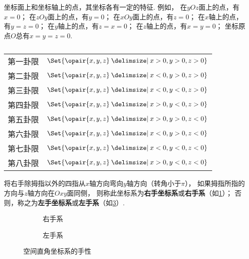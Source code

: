 坐标面上和坐标轴上的点，其坐标各有一定的特征.
例如，%
在\(yOz\)面上的点，有\(x=0\)；
在\(zOy\)面上的点，有\(y=0\)；
在\(xOy\)面上的点，有\(z=0\)；
在\(x\)轴上的点，有\(y=z=0\)；
在\(y\)轴上的点，有\(z=x=0\)；
在\(z\)轴上的点，有\(x=y=0\)；
坐标原点\(O\)总有\(x=y=z=0\).

\begin{table}
\centering
\def\guaxian#1#2#3{\Set{ \opair{x,y,z} \given x #1 0, y #2 0, z #3 0 }}%
\def\arraystretch{1.2}%
\begin{tabular}{cl}%
第一卦限 & \(\guaxian{>}{>}{>}\) \\
第二卦限 & \(\guaxian{<}{>}{>}\) \\
第三卦限 & \(\guaxian{<}{<}{>}\) \\
第四卦限 & \(\guaxian{>}{<}{>}\) \\
第五卦限 & \(\guaxian{>}{>}{<}\) \\
第六卦限 & \(\guaxian{<}{>}{<}\) \\
第七卦限 & \(\guaxian{<}{<}{<}\) \\
第八卦限 & \(\guaxian{>}{<}{<}\) \\
\end{tabular}%
\caption{}
\label{table:解析几何.几何空间的八个卦限}
\end{table}

将右手除拇指以外的四指从\(x\)轴方向弯向\(y\)轴方向（转角小于\(\pi\)），
如果拇指所指的方向与\(z\)轴方向在\(Oxy\)面同侧，
则称此坐标系为\textbf{右手坐标系}或\textbf{右手系}（如\cref{figure:解析几何.右手系}）；
否则，称之为\textbf{左手坐标系}或\textbf{左手系}（如\cref{figure:解析几何.左手系}）.

\begin{figure}[ht]
	\centering
	\def\subwidth{.4\linewidth}
	\begin{subfigure}[b]{\subwidth}
		\centering
		\caption{右手系}
		\label{figure:解析几何.右手系}
	\end{subfigure}
	\begin{subfigure}[b]{\subwidth}
		\centering
		\caption{左手系}
		\label{figure:解析几何.左手系}
	\end{subfigure}
	\caption{空间直角坐标系的手性}
\end{figure}

